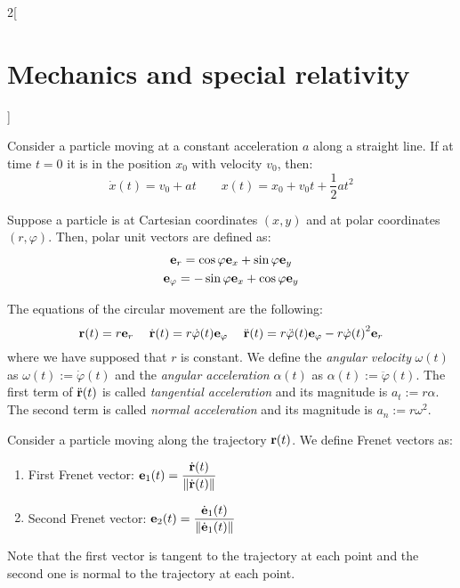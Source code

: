 \documentclass[../../../main.tex]{subfiles}
\begin{document}
\begin{multicols}{2}[\section{Mechanics and special relativity}]
\begin{proposition}
  \end{proposition}
  \begin{proposition}
    Consider a particle moving at a constant acceleration $a$ along a straight line. If at time $t=0$ it is in the position $x_0$ with velocity $v_0$, then:
    $$\dot{x}(t)=v_0+at\qquad x(t)=x_0+v_0t+\frac{1}{2}at^2$$
  \end{proposition}
  \begin{definition}
    Suppose a particle is at Cartesian coordinates $(x,y)$ and at polar coordinates $(r,\varphi)$. Then, polar unit vectors are defined as:
    \begin{gather*}
      \boldsymbol{\mathrm{e}}_r=\cos\varphi\boldsymbol{\mathrm{e}}_x+\sin\varphi\boldsymbol{\mathrm{e}}_y\\
      \boldsymbol{\mathrm{e}}_\varphi=-\sin\varphi\boldsymbol{\mathrm{e}}_x+\cos\varphi\boldsymbol{\mathrm{e}}_y
    \end{gather*}
  \end{definition}
  \begin{definition}
    The equations of the circular movement are the following: $$\boldsymbol{\mathrm{r}}(t)=r\boldsymbol{\mathrm{e}}_r\quad\;\dot{\boldsymbol{\mathrm{r}}}(t)=r\dot{\varphi}(t)\boldsymbol{\mathrm{e}}_\varphi\quad\;\ddot{\boldsymbol{\mathrm{r}}}(t)=r\ddot{\varphi}(t)\boldsymbol{\mathrm{e}}_\varphi-r{\dot{\varphi}(t)}^2\boldsymbol{\mathrm{e}}_r$$ where we have supposed that $r$ is constant. We define the \emph{angular velocity} $\omega(t)$ as $\omega(t):=\dot{\varphi}(t)$ and the \emph{angular acceleration} $\alpha(t)$ as $\alpha(t):=\ddot{\varphi}(t)$. The first term of $\ddot{\boldsymbol{\mathrm{r}}}(t)$ is called \emph{tangential acceleration} and its magnitude is $a_t:=r\alpha$. The second term is called \emph{normal acceleration} and its magnitude is $a_n:=r\omega^2$.
  \end{definition}
  \begin{definition}
    Consider a particle moving along the trajectory $\boldsymbol{\mathrm{r}}(t)$. We define Frenet vectors as:
    \begin{enumerate}
      \item First Frenet vector: $\displaystyle\boldsymbol{\mathrm{e}}_1(t)=\frac{\dot{\boldsymbol{\mathrm{r}}}(t)}{\|\dot{\boldsymbol{\mathrm{r}}}(t)\|}$
      \item Second Frenet vector: $\displaystyle\boldsymbol{\mathrm{e}}_2(t)=\frac{\dot{\boldsymbol{\mathrm{e}}}_1(t)}{\|\dot{\boldsymbol{\mathrm{e}}}_1(t)\|}$
    \end{enumerate}
    Note that the first vector is tangent to the trajectory at each point and the second one is normal to the trajectory at each point.


\end{definition}
\end{multicols}
\end{document}
